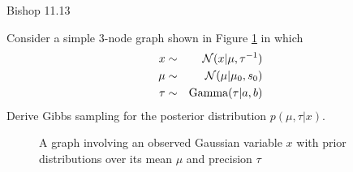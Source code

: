 \documentclass{amsmlaj}
\begin{document}
\begin{problem}\textsf{Bishop 11.13}

\noindent Consider a simple 3-node graph shown in Figure \ref{fig:gauss} in which
\begin{eqnarray}
x & \sim & \mathcal{N}(x|\mu,\tau^{-1}) \nonumber\\
\mu & \sim & \mathcal{N}(\mu|\mu_0,s_0) \nonumber\\
\tau & \sim & \text{Gamma}(\tau|a,b)
\end{eqnarray}
Derive Gibbs sampling for the posterior distribution $p(\mu,\tau|x)$.
\begin{figure}[H]
\begin{center}
\caption{A graph involving an observed Gaussian variable $x$ with prior distributions over its mean $\mu$ and precision $\tau$}
\label{fig:gauss}
\end{center}
\end{figure}


\end{problem}
\end{document}

